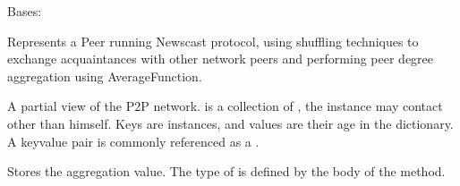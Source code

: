 \documentclass[letterpaper,10pt,english]{sphinxmanual}
\begin{document}

\begin{fulllineitems}
\label{\detokenize{app.domain:app.domain.network_nodes.NewscastNode}}
Bases: {\hyperref[\detokenize{app.domain:app.domain.network_nodes.Node}]{}}

Represents a Peer running Newscast protocol, using shuffling
techniques to exchange acquaintances with other network peers and
performing peer degree aggregation using AverageFunction.

\begin{fulllineitems}
\label{\detokenize{app.domain:app.domain.network_nodes.NewscastNode.view}}
A partial view of the P2P network.  is a collection of
{\hyperref[\detokenize{app.domain:app.domain.network_nodes.NewscastNode}]{}},
the  instance may contact other than himself. Keys
are {\hyperref[\detokenize{app.domain:app.domain.network_nodes.NewscastNode}]{}} instances, and values are their age
in the dictionary. A key\sphinxhyphen{}value pair is commonly referenced as a
.

\end{fulllineitems}


\begin{fulllineitems}
\label{\detokenize{app.domain:app.domain.network_nodes.NewscastNode.aggregation_value}}
Stores the aggregation value. The type of 
is defined by the body of the {\hyperref[\detokenize{app.domain:app.domain.network_nodes.NewscastNode.aggregate}]{}} method.


\end{fulllineitems}
\end{fulllineitems}
\end{document}
